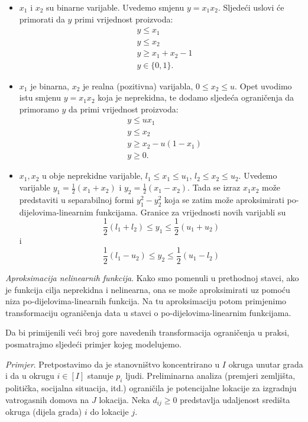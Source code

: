 \documentclass[a4paper, utf8, 11pt, colorlinks]{book}
\begin{document}
 \begin{itemize}
 	\item $x_1$ i $x_2$ su binarne varijable. Uvedemo smjenu $y=x_1 x_2$. Sljedeći uslovi će primorati da $y$ primi vrijednost proizvoda:
 	  \begin{align*}
 		      &y \leq x_1 \\
 		      &y \leq x_2 \\
 		      & y \geq x_1 + x_2 - 1 \\
 		      & y \in \{0, 1\}.
 	  \end{align*}
   \item $x_1$ je binarna, $x_2$ je realna (pozitivna) varijabla, $0 \leq x_2 \leq u$. Opet uvodimo istu smjenu $y= x_1 x_2$ koja je neprekidna, te dodamo sljedeća ograničenja da primoramo $y$ da primi vrijednost proizvoda:
    \begin{align*}
    	 &y \leq u x_1 \\
    	 &y \leq x_2 \\
    	 & y \geq x_2 - u(1-x_1) \\
    	 & y \geq 0.
    \end{align*}
  \item $x_1, x_2$ u obje neprekidne varijable, $l_1 \leq x_1 \leq u_1$, $l_2 \leq x_2 \leq u_2$. Uvedemo varijable $y_1 = \frac{1}{2}( x_1 + x_2) $ i  $y_2 =\frac{1}{2}(x_1 - x_2)$. Tada se izraz $x_1x_2$ može predstaviti u separabilnoj formi $y_1^2 - y_2^2$ koja se zatim može aproksimirati po-dijelovima-linearnim funkcijama. Granice za vrijednosti novih varijabli su 
  $$ \frac{1}{2}(l_1 + l_2) \leq y_1 \leq \frac{1}{2}(u_1 + u_2)$$ i 
  $$ \frac{1}{2}(l_1 - u_2) \leq y_2 \leq \frac{1}{2}(u_1 - l_2) $$
  
 \end{itemize} 

\emph{Aproksimacija nelinearnih funkcija}. Kako smo pomenuli u prethodnoj stavci, ako je funkcija cilja neprekidna i nelinearna, ona se može aproksimirati uz pomoću niza po-dijelovima-linearnih funkcija. Na tu aproksimaciju potom primjenimo transformaciju ograničenja  data u stavci o po-dijelovima-linearnim funkcijama. 

Da bi primijenili veći broj gore navedenih transformacija ograničenja u praksi, posmatrajmo sljedeći primjer kojeg modelujemo. 


\emph{Primjer}. Pretpostavimo da je stanovništvo koncentrirano u $I$ okruga  unutar grada i da u okrugu $i\in [I]$ stanuje $p_i$ ljudi. Preliminarna analiza (premjeri zemljišta, politička, socijalna situacija, itd.) ograničila je potencijalne lokacije za izgradnju vatrogasnih domova na $J$ lokacija. Neka $d_{ij} \geq 0$ predstavlja udaljenost   središta okruga (dijela grada) $i$  do lokacije $j$. 
\end{document}
